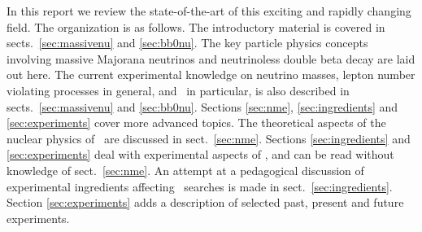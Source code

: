 In this report we review the state-of-the-art of this exciting and rapidly changing field. 
The organization is as follows. The introductory material is covered in sects.~\ref{sec:massivenu} and \ref{sec:bb0nu}. The key particle physics concepts involving massive Majorana neutrinos and neutrinoless double beta decay are laid out here. The current experimental knowledge on neutrino masses, lepton number violating processes in general, and \bbonu\ in particular, is also described in sects.~\ref{sec:massivenu} and \ref{sec:bb0nu}. Sections \ref{sec:nme}, \ref{sec:ingredients} and \ref{sec:experiments} cover more advanced topics. The theoretical aspects of the nuclear physics of \bbonu\ are discussed in sect.~\ref{sec:nme}. Sections \ref{sec:ingredients} and \ref{sec:experiments} deal with experimental aspects of \bbonu, and can be read without knowledge of sect.~\ref{sec:nme}. An attempt at a pedagogical discussion of experimental ingredients affecting \bbonu\ searches is made in sect.~\ref{sec:ingredients}. Section \ref{sec:experiments} adds a description of selected past, present and future experiments. 

